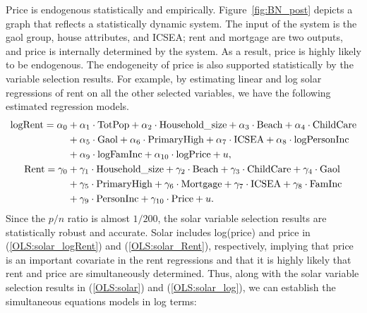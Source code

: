 \documentclass[11pt,review,authoryear]{elsarticle}
\begin{document}
Price is endogenous statistically and empirically. Figure~\ref{fig:BN_post} depicts a graph that reflects a statistically dynamic system. The input of the system is the gaol group, house attributes, and ICSEA; rent and mortgage are two outputs, and price is internally determined by the system. As a result, price is highly likely to be endogenous. The endogeneity of price is also supported statistically by the variable selection results. For example, by estimating linear and log solar regressions of rent on all the other selected variables, we have the following estimated regression models.
%
\begin{align}
  \mathrm{logRent} = \alpha_0 & + \alpha_1 \cdot \mathrm{TotPop} + \alpha_2 \cdot \mathrm{Household\_size} + \alpha_3 \cdot \mathrm{Beach} + \alpha_4 \cdot \mathrm{ChildCare} \notag  \\
  & + \alpha_5 \cdot \mathrm{Gaol} + \alpha_6 \cdot \mathrm{PrimaryHigh}  + \alpha_7 \cdot \mathrm{ICSEA} + \alpha_8 \cdot \mathrm{logPersonInc} \notag   \\
  & + \alpha_9 \cdot \mathrm{logFamInc} + \alpha_{10} \cdot \mathrm{logPrice} + u, \label{OLS:solar_logRent} \\
  \mathrm{Rent} = \gamma_0 & + \gamma_1 \cdot \mathrm {Household\_size} + \gamma_2 \cdot \mathrm{Beach} + \gamma_3 \cdot \mathrm{ChildCare} + \gamma_4 \cdot \mathrm{Gaol} \notag \\
  & + \gamma_5 \cdot \mathrm{PrimaryHigh} + \gamma_6 \cdot \mathrm{Mortgage} + \gamma_7 \cdot \mathrm{ICSEA} + \gamma_8 \cdot \mathrm{FamInc} \notag \\
  & + \gamma_9 \cdot \mathrm{PersonInc} + \gamma_{10} \cdot \mathrm{Price} + u. \label{OLS:solar_Rent}
\end{align}
%
Since the $p/n$ ratio is almost $1/200$, the solar variable selection results are statistically robust and accurate. Solar includes log(price) and price in (\ref{OLS:solar_logRent}) and (\ref{OLS:solar_Rent}), respectively, implying that price is an important covariate in the rent regressions and that it is highly likely that rent and price are simultaneously determined. Thus, along with the solar variable selection results in (\ref{OLS:solar}) and (\ref{OLS:solar_log}), we can establish the simultaneous equations models in log terms:
%
\end{document}
